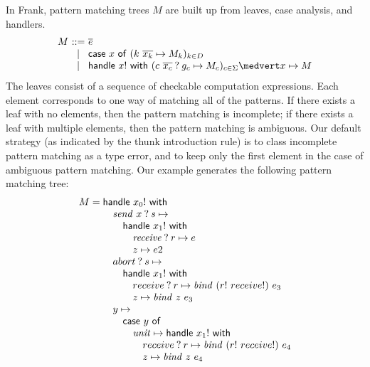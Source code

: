 \documentclass[preprint]{sigplanconf}
\makeatletter
\newcommand{\many}{\overline}
\newcommand\ba{\begin{array}}
\newcommand\ea{\end{array}}
\newcommand{\bstack}{\begin{array}[t]{@{}l@{}}}
\newcommand{\estack}{\end{array}}
\newenvironment{equations}{\[\ba{@{}r@{~}c@{~}l@{}}}{\ea\]}
\newcommand{\sigs}{\Sigma}
\newcommand{\effbox}[1]{[#1]}
\newcommand{\key}[1]{\mathsf{#1}}
\newcommand{\var}{\mathit}
\newcommand{\handleSymbol}{\mathbin{?}}
\newcommand{\handle}[2]{{#1} \handleSymbol {#2}}
\newcommand{\force}[1]{{#1}!}
\makeatother
\begin{document}
In Frank, pattern matching trees $M$ are built up from leaves, case
analysis, and handlers.
\begin{equations}
M &::= & \many{e} \\
  &\mid& \key{case}~x~\key{of}~(k~\many{x_k} \mapsto M_k)_{k \in D} \\
  &\mid& \key{handle}~\force{x}~\key{with}~
          (\handle{c~\many{x_c}}{g_c} \mapsto M_c)_{c \in \sigs} \medvert
          x        \mapsto M
\end{equations}%
The leaves consist of a sequence of checkable computation
expressions. Each element corresponds to one way of matching all of
the patterns. If there exists a leaf with no elements, then the
pattern matching is incomplete; if there exists a leaf with multiple
elements, then the pattern matching is ambiguous.
%
Our default strategy (as indicated by the thunk introduction rule) is
to class incomplete pattern matching as a type error, and to keep only
the first element in the case of ambiguous pattern matching.
%
Our example generates the following pattern matching tree:
\[
M = \bstack
    \key{handle}~\force{x_0}~\key{with} \\
    \quad  \handle{\var{send}~x}{s} \mapsto \\
    \quad\quad \key{handle}~\force{x_1}~\key{with} \\
    \quad\quad\quad \handle{\var{receive}}{r} \mapsto e \\
    \quad\quad\quad z \mapsto e2 \\
    \quad  \handle{abort}{s} \mapsto \\
    \quad\quad \key{handle}~\force{x_1}~\key{with} \\
    \quad\quad\quad    \handle{receive}{r} \mapsto \var{bind}~(\force{r}~\force{receive})~e_3 \\
    \quad\quad\quad    z \mapsto \var{bind}~z~e_3 \\
    \quad  y \mapsto \\
    \quad\quad  \key{case}~y~\key{of} \\
    \quad\quad\quad  \var{unit} \mapsto \key{handle}~\force{x_1}~\key{with} \\
    \quad\quad\quad\quad    \handle{receive}{r} \mapsto \var{bind}~(\force{r}~\force{receive})~e_4 \\
    \quad\quad\quad\quad    z \mapsto \var{bind}~z~e_4 \\
\estack
\]
\end{document}
